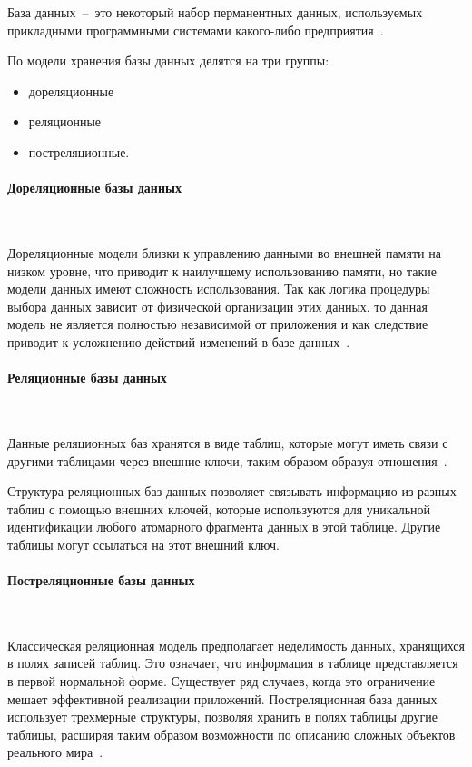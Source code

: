 База данных~--~это некоторый набор перманентных данных, используемых прикладными программными системами какого-либо предприятия~\cite{intro-db-williams}.

По модели хранения базы данных делятся на три группы:
\begin{itemize}
	\item дореляционные
	\item реляционные
	\item постреляционные.
\end{itemize}

\paragraph{Дореляционные базы данных}
~\par
Дореляционные модели близки к управлению данными во внешней памяти на низком уровне, 
что приводит к наилучшему использованию памяти, но такие модели данных имеют сложность  использования. 
Так как логика процедуры выбора данных зависит от физической организации этих данных, то данная модель не является полностью независимой от приложения и как следствие приводит к усложнению действий изменений в базе данных~\cite{kuznecov-db}.

\paragraph{Реляционные базы данных}
~\par
Данные реляционных баз хранятся в виде таблиц, которые могут иметь связи с другими таблицами через внешние ключи, таким образом образуя отношения~\cite{kuznecov-db}.

Структура реляционных баз данных позволяет связывать информацию из разных таблиц с помощью внешних ключей, которые используются для уникальной идентификации любого атомарного фрагмента данных в этой таблице. 
Другие таблицы могут ссылаться на этот внешний ключ.

\paragraph{Постреляционные базы данных}
~\par
Классическая реляционная модель предполагает неделимость данных, хранящихся в полях записей таблиц. 
Это означает, что информация в таблице представляется в первой нормальной форме. 
Существует ряд случаев, когда это ограничение мешает эффективной реализации приложений. 
Постреляционная база данных использует трехмерные структуры, позволяя хранить в полях таблицы другие таблицы, расширяя таким образом возможности по описанию сложных объектов реального мира~\cite{postsql-db}.

